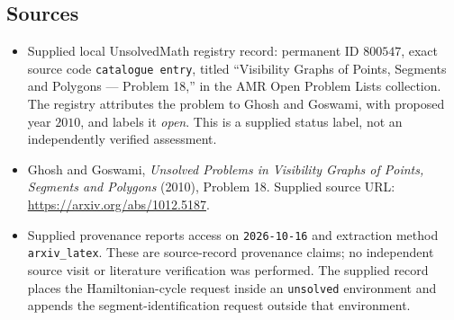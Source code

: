 \documentclass[11pt]{article}
\begin{document}
\subsection{Sources}
\begin{itemize}
\item Supplied local UnsolvedMath registry record: permanent ID \(800547\), exact source code \texttt{catalogue entry}, titled ``Visibility Graphs of Points, Segments and Polygons --- Problem 18,'' in the AMR Open Problem Lists collection. The registry attributes the problem to Ghosh and Goswami, with proposed year \(2010\), and labels it \emph{open}. This is a supplied status label, not an independently verified assessment.
\item Ghosh and Goswami, \emph{Unsolved Problems in Visibility Graphs of Points, Segments and Polygons} (2010), Problem 18. Supplied source URL: \url{https://arxiv.org/abs/1012.5187}.
\item Supplied provenance reports access on \texttt{2026-10-16} and extraction method \texttt{arxiv\_latex}. These are source-record provenance claims; no independent source visit or literature verification was performed. The supplied record places the Hamiltonian-cycle request inside an \texttt{unsolved} environment and appends the segment-identification request outside that environment.
\end{itemize}
\end{document}
